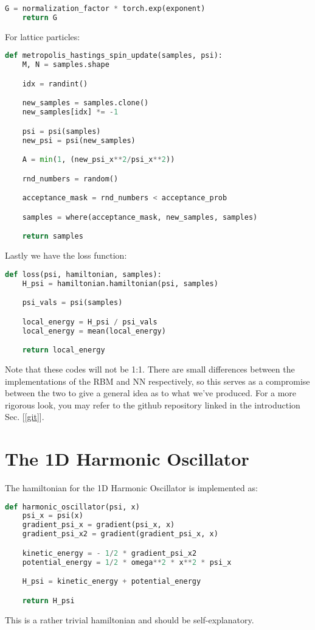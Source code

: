 \documentclass[12pt]{article}
\begin{document}
{\begin{lstlisting}[language=Python]
    G = normalization_factor * torch.exp(exponent)
    return G
\end{lstlisting}
For lattice particles:
\begin{lstlisting}[language=Python]
def metropolis_hastings_spin_update(samples, psi):
    M, N = samples.shape

    idx = randint()

    new_samples = samples.clone()
    new_samples[idx] *= -1

    psi = psi(samples)
    new_psi = psi(new_samples)

    A = min(1, (new_psi_x**2/psi_x**2))

    rnd_numbers = random()

    acceptance_mask = rnd_numbers < acceptance_prob

    samples = where(acceptance_mask, new_samples, samples)

    return samples
\end{lstlisting}
Lastly we have the loss function:
\begin{lstlisting}[language=Python]
def loss(psi, hamiltonian, samples):
    H_psi = hamiltonian.hamiltonian(psi, samples)

    psi_vals = psi(samples)

    local_energy = H_psi / psi_vals
    local_energy = mean(local_energy)

    return local_energy
\end{lstlisting}
Note that these codes will not be 1:1. There are small differences between the implementations of the RBM and NN respectively, so this serves as a compromise between the two to give a general idea as to what we've produced. For a more rigorous look, you may refer to the github repository linked in the introduction Sec. [\ref{git}].
\section{The 1D Harmonic Oscillator}
The hamiltonian for the 1D Harmonic Oscillator is implemented as:
\begin{lstlisting}[language=Python]
def harmonic_oscillator(psi, x)
    psi_x = psi(x)
    gradient_psi_x = gradient(psi_x, x)
    gradient_psi_x2 = gradient(gradient_psi_x, x)

    kinetic_energy = - 1/2 * gradient_psi_x2
    potential_energy = 1/2 * omega**2 * x**2 * psi_x

    H_psi = kinetic_energy + potential_energy

    return H_psi
\end{lstlisting}
This is a rather trivial hamiltonian and should be self-explanatory.
}
\end{document}
